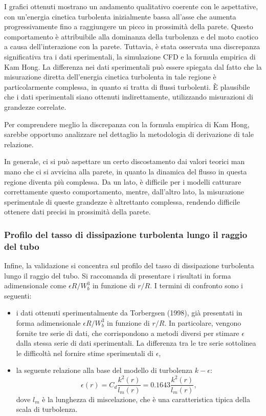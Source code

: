 I grafici ottenuti mostrano un andamento qualitativo coerente con le aspettative, con un'energia cinetica turbolenta inizialmente bassa all'asse che aumenta progressivamente fino a raggiungere un picco in prossimità della parete. Questo comportamento è attribuibile alla dominanza della turbolenza e del moto caotico a causa dell'interazione con la parete. Tuttavia, è stata osservata una discrepanza significativa tra i dati sperimentali, la simulazione CFD e la formula empirica di Kam Hong. La differenza nei dati sperimentali può essere spiegata dal fatto che la misurazione diretta dell'energia cinetica turbolenta in tale regione è particolarmente complessa, in quanto si tratta di flussi turbolenti. È plausibile che i dati sperimentali siano ottenuti indirettamente, utilizzando misurazioni di grandezze correlate.

Per comprendere meglio la discrepanza con la formula empirica di Kam Hong, sarebbe opportuno analizzare nel dettaglio la metodologia di derivazione di tale relazione.

In generale, ci si può aspettare un certo discostamento dai valori teorici man mano che ci si avvicina alla parete, in quanto la dinamica del flusso in questa regione diventa più complessa. Da un lato, è difficile per i modelli catturare correttamente questo comportamento, mentre, dall'altro lato, la misurazione sperimentale di queste grandezze è altrettanto complessa, rendendo difficile ottenere dati precisi in prossimità della parete.

\subsubsection*{Profilo del tasso di dissipazione turbolenta lungo il raggio del tubo}

Infine, la validazione si concentra sul profilo del tasso di dissipazione turbolenta lungo il raggio del tubo. Si raccomanda di presentare i risultati in forma adimensionale come \(\epsilon R/W_b^3\) in funzione di \(r/R\). I termini di confronto sono i seguenti:
\begin{itemize}
    \item i dati ottenuti sperimentalmente da Torbergsen (1998), già presentati in forma adimensionale \(\epsilon R/W_b^3\) in funzione di \(r/R\). In particolare, vengono fornite tre serie di dati, che corrispondono a metodi diversi per stimare \(\epsilon\) dalla stessa serie di dati sperimentali. La differenza tra le tre serie sottolinea le difficoltà nel fornire stime sperimentali di \(\epsilon\),
    \item la seguente relazione alla base del modello di turbolenza \(k-\epsilon\):
    \[
    \epsilon(r) = C_d \frac{k^2(r)}{l_m(r)} = 0.1643 \frac{k^2(r)}{l_m(r)},
    \]
    dove \(l_m\) è la lunghezza di miscelazione, che è una caratteristica tipica della scala di turbolenza.
\end{itemize}

